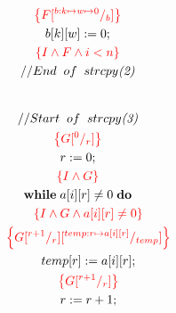 \documentclass [a4paper, 12pt, fleqn]  {article}
\newcommand{\assn}[1]{{\color{red}\left\{#1\right\}}}
\begin{document}
\begin{gather*}
\hspace{1.2cm} \assn{ F \subst {b: k \mapsto w \mapsto 0} b   } \\
\hspace{1.2cm} b[k][w] \Ass 0; \\
\hspace{1.2cm} \assn{I \AND F \AND i < n} \\
\hspace{1.2cm} //End \hspace{0.2cm} of \hspace{0.2cm} strcpy \textit{(2)} \\  \\%
\end{gather*}

\begin{gather*}
\hspace{1.2cm} //Start \hspace{0.2cm} of \hspace{0.2cm} strcpy \textit{(3)} \\  %
\hspace{1.2cm} \assn{G \subst 0r} \\
\hspace{1.2cm} r \Ass 0; \\
\hspace{1.2cm} \assn{I \AND G} \\
\hspace{1.2cm} \WHILE \hspace{0.1cm} a[i][r] \neq 0 \hspace{0.1cm} \DO \\
\hspace{1.2cm} \hspace{0.6cm} \assn{I \AND G \AND a[i][r] \neq 0} \\
\hspace{1.2cm} \hspace{0.6cm} \assn{G \subst {r + 1} r \subst {temp:r \mapsto a[i][r]}{temp}} \\
\hspace{1.2cm} \hspace{0.6cm} temp[r] \Ass a[i][r]; \\
\hspace{1.2cm} \hspace{0.6cm} \assn{G \subst {r + 1}  {r}   } \\
\hspace{1.2cm} \hspace{0.6cm} r \Ass r + 1; \\

\end{gather*}
\end{document}
